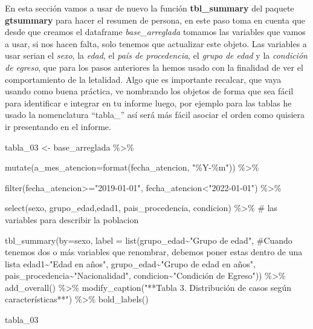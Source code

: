\documentclass[
  letterpaper,
  DIV=11,
  numbers=noendperiod]{scrreprt}
\newenvironment{Shaded}{\begin{snugshade}}{\end{snugshade}}
\newcommand{\AttributeTok}[1]{\textcolor[rgb]{0.40,0.45,0.13}{#1}}
\newcommand{\CommentTok}[1]{\textcolor[rgb]{0.37,0.37,0.37}{#1}}
\newcommand{\FunctionTok}[1]{\textcolor[rgb]{0.28,0.35,0.67}{#1}}
\newcommand{\NormalTok}[1]{\textcolor[rgb]{0.00,0.23,0.31}{#1}}
\newcommand{\OtherTok}[1]{\textcolor[rgb]{0.00,0.23,0.31}{#1}}
\newcommand{\SpecialCharTok}[1]{\textcolor[rgb]{0.37,0.37,0.37}{#1}}
\newcommand{\StringTok}[1]{\textcolor[rgb]{0.13,0.47,0.30}{#1}}
\begin{document}
En esta sección vamos a usar de nuevo la función \textbf{tbl\_summary}
del paquete \textbf{gtsummary} para hacer el resumen de persona, en este
paso toma en cuenta que desde que creamos el dataframe
\emph{base\_arreglada} tomamos las variables que vamos a usar, si nos
hacen falta, solo tenemos que actualizar este objeto. Las variables a
usar serian el \emph{sexo}, la \emph{edad}, el \emph{país de
procedencia}, el \emph{grupo de edad} y la \emph{condición de egreso},
que para los pasos anteriores la hemos usado con la finalidad de ver el
comportamiento de la letalidad. Algo que es importante recalcar, que
vaya usando como buena práctica, ve nombrando los objetos de forma que
sea fácil para identificar e integrar en tu informe luego, por ejemplo
para las tablas he usado la nomenclatura ``tabla\_'' así será más fácil
asociar el orden como quisiera ir presentando en el informe.

\begin{Shaded}
\begin{Highlighting}[]
\NormalTok{tabla\_03 }\OtherTok{\textless{}{-}}\NormalTok{ base\_arreglada }\SpecialCharTok{\%\textgreater{}\%} 
  
\FunctionTok{mutate}\NormalTok{(}\AttributeTok{a\_mes\_atencion=}\FunctionTok{format}\NormalTok{(fecha\_atencion, }\StringTok{"\%Y{-}\%m"}\NormalTok{)) }\SpecialCharTok{\%\textgreater{}\%} 
 
   \FunctionTok{filter}\NormalTok{(fecha\_atencion}\SpecialCharTok{\textgreater{}=}\StringTok{"2019{-}01{-}01"}\NormalTok{, fecha\_atencion}\SpecialCharTok{\textless{}}\StringTok{"2022{-}01{-}01"}\NormalTok{) }\SpecialCharTok{\%\textgreater{}\%} 
  
  \FunctionTok{select}\NormalTok{(sexo, grupo\_edad,edad1, pais\_procedencia, condicion) }\SpecialCharTok{\%\textgreater{}\%}  \CommentTok{\# las variables para describir la poblacion}

  \FunctionTok{tbl\_summary}\NormalTok{(}\AttributeTok{by=}\NormalTok{sexo,}
             \AttributeTok{label =} \FunctionTok{list}\NormalTok{(grupo\_edad}\SpecialCharTok{\textasciitilde{}}\StringTok{"Grupo de edad"}\NormalTok{, }\CommentTok{\#Cuando tenemos dos o más variables que renombrar, debemos poner estas dentro de una lista}
\NormalTok{              edad1}\SpecialCharTok{\textasciitilde{}}\StringTok{"Edad en años"}\NormalTok{,}
\NormalTok{              grupo\_edad}\SpecialCharTok{\textasciitilde{}}\StringTok{"Grupo de edad en años"}\NormalTok{,}
\NormalTok{              pais\_procedencia}\SpecialCharTok{\textasciitilde{}}\StringTok{"Nacionalidad"}\NormalTok{,}
\NormalTok{              condicion}\SpecialCharTok{\textasciitilde{}}\StringTok{"Condición de Egreso"}\NormalTok{)) }\SpecialCharTok{\%\textgreater{}\%} 
  \FunctionTok{add\_overall}\NormalTok{() }\SpecialCharTok{\%\textgreater{}\%} 
  \FunctionTok{modify\_caption}\NormalTok{(}\StringTok{"**Tabla 3. Distribución de casos según características**"}\NormalTok{) }\SpecialCharTok{\%\textgreater{}\%} 
  \FunctionTok{bold\_labels}\NormalTok{()}

\NormalTok{tabla\_03}
\end{Highlighting}
\end{Shaded}
\end{document}
